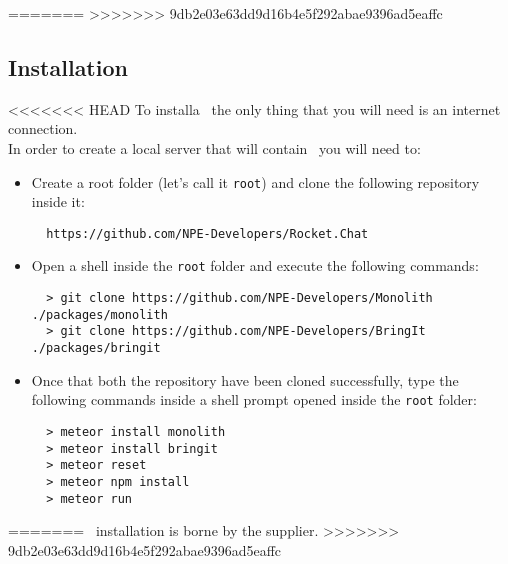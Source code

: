 =======
>>>>>>> 9db2e03e63dd9d16b4e5f292abae9396ad5eaffc


\subsection{Installation}
<<<<<<< HEAD
To installa \app\ the only thing that you will need is an internet connection. \\
In order to create a local server that will contain \app\ you will need to:
\begin{itemize}
	\item Create a root folder (let's call it \texttt{root}) and clone the following  repository inside it:
	\begin{lstlisting}
  https://github.com/NPE-Developers/Rocket.Chat
	\end{lstlisting}
	
	\item Open a shell inside the \texttt{root} folder and execute the following commands:
	\begin{lstlisting}
  > git clone https://github.com/NPE-Developers/Monolith ./packages/monolith
  > git clone https://github.com/NPE-Developers/BringIt ./packages/bringit
	\end{lstlisting}
	
	\item Once that both the repository have been cloned successfully, type the following commands inside a shell prompt opened inside the \texttt{root} folder:
	\begin{lstlisting}
  > meteor install monolith
  > meteor install bringit
  > meteor reset
  > meteor npm install
  > meteor run
	\end{lstlisting}


\end{itemize}


=======
\app\ installation is borne by the supplier.
>>>>>>> 9db2e03e63dd9d16b4e5f292abae9396ad5eaffc

